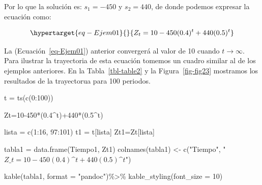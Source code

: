 \documentclass[
  a4paper,
]{article}
\newenvironment{Shaded}{}{}
\newcommand{\AttributeTok}[1]{\textcolor[rgb]{0.84,0.23,0.29}{#1}}
\newcommand{\DecValTok}[1]{\textcolor[rgb]{0.00,0.36,0.77}{#1}}
\newcommand{\FloatTok}[1]{\textcolor[rgb]{0.00,0.36,0.77}{#1}}
\newcommand{\FunctionTok}[1]{\textcolor[rgb]{0.44,0.26,0.76}{#1}}
\newcommand{\NormalTok}[1]{\textcolor[rgb]{0.14,0.16,0.18}{#1}}
\newcommand{\OtherTok}[1]{\textcolor[rgb]{0.44,0.26,0.76}{#1}}
\newcommand{\SpecialCharTok}[1]{\textcolor[rgb]{0.00,0.36,0.77}{#1}}
\newcommand{\StringTok}[1]{\textcolor[rgb]{0.01,0.18,0.38}{#1}}
\begin{document}
Por lo que la solución es: \(s_1 = -450\) y \(s_2 = 440\), de donde
podemos expresar la ecuación como:

\begin{equation}\protect\hypertarget{eq-Ejem01}{}{
Z_t = 10 - 450(0.4)^t + 440(0.5)^t
}\label{eq-Ejem01}\end{equation}

La (Ecuación~\ref{eq-Ejem01}) anterior convergerá al valor de 10 cuando
\(t \rightarrow \infty\). Para ilustrar la trayectoria de esta ecuación
tomemos un cuadro similar al de los ejemplos anteriores. En la
Tabla~\ref{tbl-table2} y la Figura~\ref{fig-fig23} mostramos los
resultados de la trayectorua para 100 periodos.

\begin{Shaded}
\begin{Highlighting}[]
\NormalTok{t }\OtherTok{=} \FunctionTok{ts}\NormalTok{(}\FunctionTok{c}\NormalTok{(}\DecValTok{0}\SpecialCharTok{:}\DecValTok{100}\NormalTok{))}

\NormalTok{Zt}\OtherTok{=}\DecValTok{10{-}450}\SpecialCharTok{*}\NormalTok{(}\FloatTok{0.4}\SpecialCharTok{\^{}}\NormalTok{t)}\SpecialCharTok{+}\DecValTok{440}\SpecialCharTok{*}\NormalTok{(}\FloatTok{0.5}\SpecialCharTok{\^{}}\NormalTok{t)}

\NormalTok{lista }\OtherTok{=} \FunctionTok{c}\NormalTok{(}\DecValTok{1}\SpecialCharTok{:}\DecValTok{16}\NormalTok{, }\DecValTok{97}\SpecialCharTok{:}\DecValTok{101}\NormalTok{)}
\NormalTok{t1 }\OtherTok{=}\NormalTok{ t[lista]}
\NormalTok{Zt1}\OtherTok{=}\NormalTok{Zt[lista]}


\NormalTok{tabla1 }\OtherTok{=} \FunctionTok{data.frame}\NormalTok{(Tiempo1, Zt1)}
\FunctionTok{colnames}\NormalTok{(tabla1) }\OtherTok{\textless{}{-}} \FunctionTok{c}\NormalTok{(}\StringTok{"Tiempo"}\NormalTok{, }\StringTok{"$Z\_t =10{-}450(0.4)\^{}t+440(0.5)\^{}t$"}\NormalTok{)}

\FunctionTok{kable}\NormalTok{(tabla1, }\AttributeTok{format =} \StringTok{"pandoc"}\NormalTok{)}\SpecialCharTok{\%\textgreater{}\%}
  \FunctionTok{kable\_styling}\NormalTok{(}\AttributeTok{font\_size =} \DecValTok{10}\NormalTok{)}
\end{Highlighting}
\end{Shaded}
\end{document}
